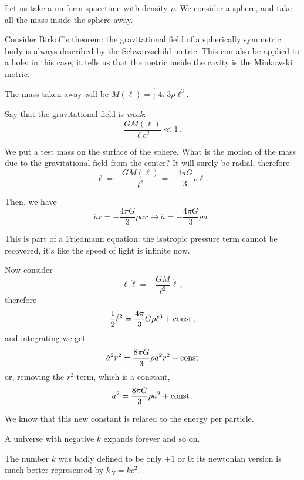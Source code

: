 \documentclass[main.tex]{subfiles}
\begin{document}
Let us take a uniform spacetime with density \(\rho\). We consider a sphere, and take all the mass inside the sphere away.

Consider Birkoff's theorem: the gravitational field of a spherically symmetric body is always described by the Schwarzschild metric.
This can also be applied to a hole: in this case, it tells us that the metric inside the cavity is the Minkowski metric.

The mass taken away will be \(M(\ell) = \frac[i]{4 \pi}{3} \rho \ell^{3}\).

Say that the gravitational field is \emph{weak}:
\begin{equation}
  \frac{GM(\ell)}{\ell c^2} \ll 1\,.
\end{equation}

We put a test mass on the surface of the sphere. What is the motion of the mass due to the gravitational field from the center? It will surely be radial, therefore
\begin{equation}
  \ddot{\ell} = - \frac{GM(\ell)}{l^2} = - \frac{4 \pi G}{3} \rho \ell\,.
\end{equation}

Then, we have
\begin{equation}
  \ddot{a} r = - \frac{4 \pi G}{3} \rho a r
  \to
  \ddot{a} = - \frac{4 \pi G}{3} \rho a\,.
\end{equation}

This is part of a Friedmann equation: the isotropic pressure term cannot be recovered, it's like the speed of light is infinite now.

Now consider 
\begin{equation}
  \dot{\ell} \ddot{\ell} = - \frac{GM}{\ell^2} \dot{\ell}\,,
\end{equation}
%
therefore 
%
\begin{equation}
  \frac{1}{2}\dot{\ell}^2 = \frac{4 \pi}{3} G \rho \ell^{3} + \const\,,
\end{equation}
%
and integrating we get
%
\begin{equation}
  \dot{a}^2 r^2 = \frac{8 \pi G}{3} \rho a^2 r^2 + \const
\end{equation}
%
or, removing the \(r^2\) term, which is a constant,
%
\begin{equation}
    \dot{a}^2 = \frac{8 \pi G}{3} \rho a^2 + \const\,.
\end{equation}

We know that this new constant is related to the energy per particle. 

A universe with negative \(k\) expands forever and so on.

The number \(k\) was badly defined to be only \(\pm 1\) or 0: its newtonian version is much better represented by \(k_N = kc^2\).
\end{document}
